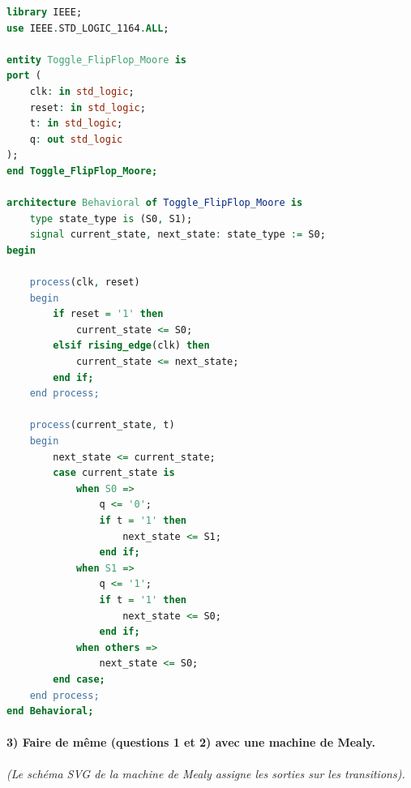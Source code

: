 \documentclass[11pt,a4paper]{article}
\begin{document}
\begin{lstlisting}[language=VHDL]
library IEEE;
use IEEE.STD_LOGIC_1164.ALL;

entity Toggle_FlipFlop_Moore is
port (
    clk: in std_logic;
    reset: in std_logic;
    t: in std_logic;
    q: out std_logic
);
end Toggle_FlipFlop_Moore;

architecture Behavioral of Toggle_FlipFlop_Moore is
    type state_type is (S0, S1);
    signal current_state, next_state: state_type := S0;
begin

    process(clk, reset)
    begin
        if reset = '1' then
            current_state <= S0;
        elsif rising_edge(clk) then
            current_state <= next_state;
        end if;
    end process;

    process(current_state, t)
    begin
        next_state <= current_state;
        case current_state is
            when S0 =>
                q <= '0';
                if t = '1' then
                    next_state <= S1;
                end if;
            when S1 =>
                q <= '1';
                if t = '1' then
                    next_state <= S0;
                end if;
            when others =>
                next_state <= S0;
        end case;
    end process;
end Behavioral;
\end{lstlisting}

\paragraph{3) Faire de même (questions 1 et 2) avec une machine de Mealy.}

\textit{(Le schéma SVG de la machine de Mealy assigne les sorties sur les transitions).}
\end{document}
